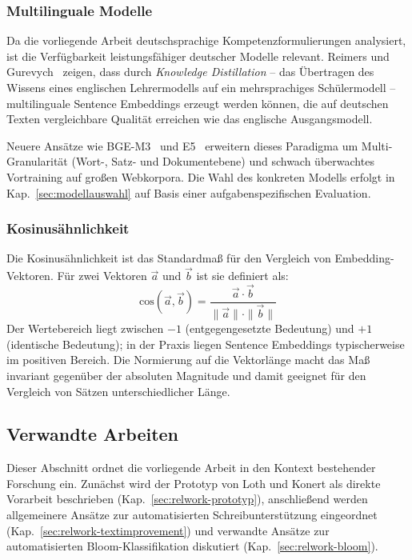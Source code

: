 \subsubsection{Multilinguale Modelle}

Da die vorliegende Arbeit deutschsprachige Kompetenzformulierungen analysiert, ist die Verfügbarkeit leistungsfähiger deutscher Modelle relevant.
Reimers und Gurevych~\cite{reimers2020multilingual} zeigen, dass durch \emph{Knowledge Distillation} -- das Übertragen des Wissens eines englischen Lehrermodells auf ein mehrsprachiges Schülermodell -- multilinguale Sentence Embeddings erzeugt werden können, die auf deutschen Texten vergleichbare Qualität erreichen wie das englische Ausgangsmodell.

Neuere Ansätze wie BGE-M3~\cite{chen2024m3embedding} und E5~\cite{wang2022e5} erweitern dieses Paradigma um Multi-Granularität (Wort-, Satz- und Dokumentebene) und schwach überwachtes Vortraining auf großen Webkorpora.
Die Wahl des konkreten Modells erfolgt in Kap.~\ref{sec:modellauswahl} auf Basis einer aufgabenspezifischen Evaluation.

\subsubsection{Kosinusähnlichkeit}

Die Kosinusähnlichkeit ist das Standardmaß für den Vergleich von Embedding-Vektoren.
Für zwei Vektoren $\vec{a}$ und $\vec{b}$ ist sie definiert als:
\begin{equation}\label{eq:cosine}
    \text{cos}(\vec{a}, \vec{b}) = \frac{\vec{a} \cdot \vec{b}}{\|\vec{a}\| \cdot \|\vec{b}\|}
\end{equation}
Der Wertebereich liegt zwischen $-1$ (entgegengesetzte Bedeutung) und $+1$ (identische Bedeutung); in der Praxis liegen Sentence Embeddings typischerweise im positiven Bereich.
Die Normierung auf die Vektorlänge macht das Maß invariant gegenüber der absoluten Magnitude und damit geeignet für den Vergleich von Sätzen unterschiedlicher Länge.

%
\subsection{Verwandte Arbeiten}\label{sec:relwork}

Dieser Abschnitt ordnet die vorliegende Arbeit in den Kontext bestehender Forschung ein.
Zunächst wird der Prototyp von Loth und Konert als direkte Vorarbeit beschrieben (Kap.~\ref{sec:relwork-prototyp}), anschließend werden allgemeinere Ansätze zur automatisierten Schreibunterstützung eingeordnet (Kap.~\ref{sec:relwork-textimprovement}) und verwandte Ansätze zur automatisierten Bloom-Klassifikation diskutiert (Kap.~\ref{sec:relwork-bloom}).

